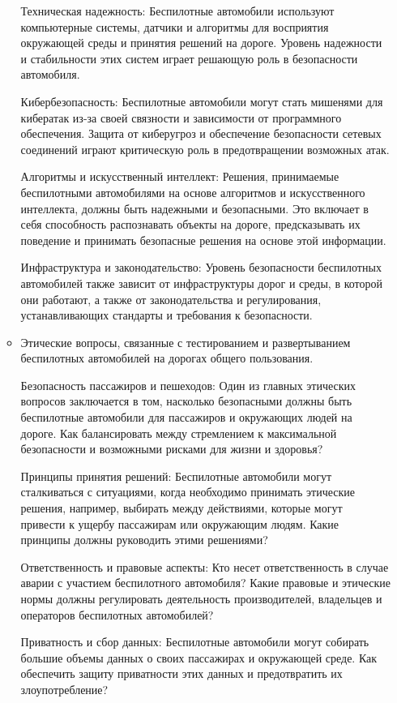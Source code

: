 \documentclass{article}
\begin{document}
\begin{itemize}
\begin{itemize}
        Техническая надежность: Беспилотные автомобили используют компьютерные системы, датчики и алгоритмы для восприятия окружающей среды и принятия решений на дороге. Уровень надежности и стабильности этих систем играет решающую роль в безопасности автомобиля.

        Кибербезопасность: Беспилотные автомобили могут стать мишенями для кибератак из-за своей связности и зависимости от программного обеспечения. Защита от киберугроз и обеспечение безопасности сетевых соединений играют критическую роль в предотвращении возможных атак.

        Алгоритмы и искусственный интеллект: Решения, принимаемые беспилотными автомобилями на основе алгоритмов и искусственного интеллекта, должны быть надежными и безопасными. Это включает в себя способность распознавать объекты на дороге, предсказывать их поведение и принимать безопасные решения на основе этой информации.

        Инфраструктура и законодательство: Уровень безопасности беспилотных автомобилей также зависит от инфраструктуры дорог и среды, в которой они работают, а также от законодательства и регулирования, устанавливающих стандарты и требования к безопасности.

        
        \item Этические вопросы, связанные с тестированием и развертыванием беспилотных автомобилей на дорогах общего пользования.

        Безопасность пассажиров и пешеходов: Один из главных этических вопросов заключается в том, насколько безопасными должны быть беспилотные автомобили для пассажиров и окружающих людей на дороге. Как балансировать между стремлением к максимальной безопасности и возможными рисками для жизни и здоровья?

        Принципы принятия решений: Беспилотные автомобили могут сталкиваться с ситуациями, когда необходимо принимать этические решения, например, выбирать между действиями, которые могут привести к ущербу пассажирам или окружающим людям. Какие принципы должны руководить этими решениями?

        Ответственность и правовые аспекты: Кто несет ответственность в случае аварии с участием беспилотного автомобиля? Какие правовые и этические нормы должны регулировать деятельность производителей, владельцев и операторов беспилотных автомобилей?

        Приватность и сбор данных: Беспилотные автомобили могут собирать большие объемы данных о своих пассажирах и окружающей среде. Как обеспечить защиту приватности этих данных и предотвратить их злоупотребление?


\end{itemize}
\end{itemize}
\end{document}
